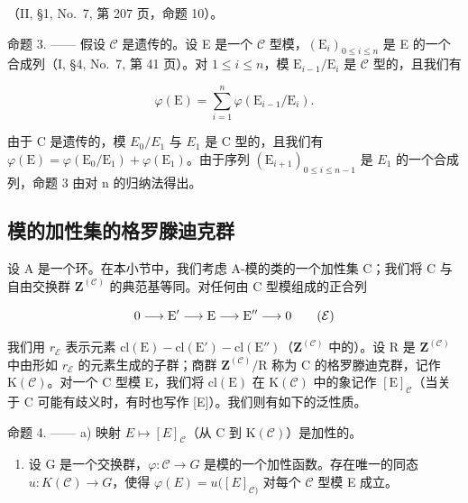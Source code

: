 （II, §1, No.~7, 第 207 页，命题 10）。

命题 3. —— 假设 \(\mathcal{C}\) 是遗传的。设 E 是一个 \(\mathcal{C}\) 型模，\((\mathrm{E}_i)_{0\leqslant i\leqslant n}\) 是 E 的一个合成列（I, §4, No.~7, 第 41 页）。对 \(1\leqslant i\leqslant n\)，模 \(\mathrm{E}_{i - 1} / \mathrm{E}_i\) 是 \(\mathcal{C}\) 型的，且我们有

\[
\varphi (\mathrm{E}) = \sum_ {i = 1} ^ {n} \varphi (\mathrm{E} _ {i - 1} / \mathrm{E} _ {i}).
\]

由于 C 是遗传的，模 \(E_{0}/E_{1}\) 与 \(E_{1}\) 是 C 型的，且我们有 \(\varphi(\mathrm{E}) = \varphi(\mathrm{E}_{0}/\mathrm{E}_{1}) + \varphi(\mathrm{E}_{1})\)。由于序列 \((\mathrm{E}_{i+1})_{0 \leqslant i \leqslant n-1}\) 是 \(E_{1}\) 的一个合成列，命题 3 由对 n 的归纳法得出。

\subsection{模的加性集的格罗滕迪克群}

设 A 是一个环。在本小节中，我们考虑 A-模的类的一个加性集 C；我们将 C 与自由交换群 \(\mathbf{Z}^{(\mathcal{C})}\) 的典范基等同。对任何由 C 型模组成的正合列

\[
0 \longrightarrow \mathrm{E} ^ {\prime} \longrightarrow \mathrm{E} \longrightarrow \mathrm{E} ^ {\prime \prime} \longrightarrow 0\tag{\( \mathcal{E} \)}
\]

我们用 \(r_{\mathcal{E}}\) 表示元素 \(\mathrm{cl}(\mathrm{E}) - \mathrm{cl}(\mathrm{E}') - \mathrm{cl}(\mathrm{E}'')\)（\(\mathbf{Z}^{(\mathcal{C})}\) 中的）。设 R 是 \(\mathbf{Z}^{(\mathcal{C})}\) 中由形如 \(r_{\mathcal{E}}\) 的元素生成的子群；商群 \(\mathbf{Z}^{(\mathcal{C})}/\mathrm{R}\) 称为 C 的格罗滕迪克群，记作 \(\mathrm{K}(\mathcal{C})\)。对一个 C 型模 E，我们将 \(\mathrm{cl}(\mathrm{E})\) 在 \(\mathrm{K}(\mathcal{C})\) 中的象记作 \([\mathrm{E}]_{\mathcal{C}}\)（当关于 C 可能有歧义时，有时也写作 {[}E{]}）。我们则有如下的泛性质。

命题 4. —— a) 映射 \(E \mapsto [E]_{\mathcal{C}}\)（从 C 到 \(\mathrm{K}(\mathcal{C})\)）是加性的。

\begin{enumerate}
\def\labelenumi{\alph{enumi})}
\setcounter{enumi}{1}
\tightlist
\item
  设 G 是一个交换群，\(\varphi : \mathcal{C} \to G\) 是模的一个加性函数。存在唯一的同态 \(u: K(\mathcal{C}) \to G\)，使得 \(\varphi(E) = u([E]_{\mathcal{C})}\) 对每个 \(\mathcal{C}\) 型模 E 成立。
\end{enumerate}

